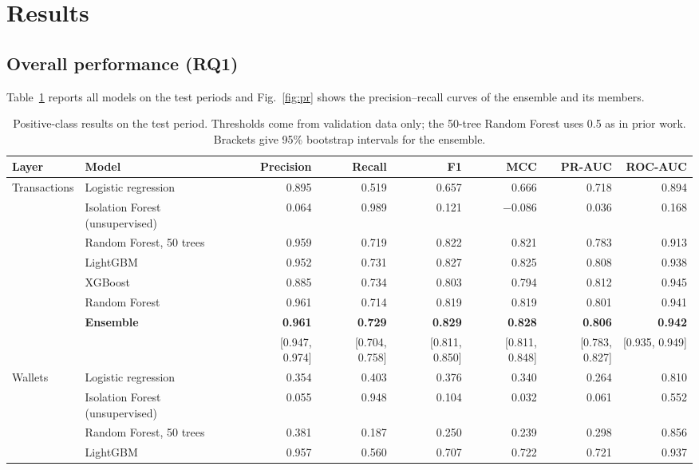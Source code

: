 \section{Results}\label{sec:results}

\subsection{Overall performance (RQ1)}\label{sec:res-main}
Table~\ref{tab:main} reports all models on the test periods and Fig.~\ref{fig:pr} shows the precision--recall curves of the ensemble and its members.

\begin{table}[t]
\caption{Positive-class results on the test period. Thresholds come from validation data only; the 50-tree Random Forest uses 0.5 as in prior work. Brackets give 95\% bootstrap intervals for the ensemble.}\label{tab:main}
\centering
\begin{tabular}{llrrrrrr}
\toprule
Layer & Model & Precision & Recall & F1 & MCC & PR-AUC & ROC-AUC \\
\midrule
Transactions & Logistic regression & 0.895 & 0.519 & 0.657 & 0.666 & 0.718 & 0.894 \\
 & Isolation Forest (unsupervised) & 0.064 & 0.989 & 0.121 & $-$0.086 & 0.036 & 0.168 \\
 & Random Forest, 50 trees~\cite{elmougy2023} & 0.959 & 0.719 & 0.822 & 0.821 & 0.783 & 0.913 \\
 & LightGBM & 0.952 & 0.731 & 0.827 & 0.825 & 0.808 & 0.938 \\
 & XGBoost & 0.885 & 0.734 & 0.803 & 0.794 & 0.812 & 0.945 \\
 & Random Forest & 0.961 & 0.714 & 0.819 & 0.819 & 0.801 & 0.941 \\
 & \textbf{Ensemble} & \textbf{0.961} & \textbf{0.729} & \textbf{0.829} & \textbf{0.828} & \textbf{0.806} & \textbf{0.942} \\
 & & [0.947, 0.974] & [0.704, 0.758] & [0.811, 0.850] & [0.811, 0.848] & [0.783, 0.827] & [0.935, 0.949] \\
\midrule
Wallets & Logistic regression & 0.354 & 0.403 & 0.376 & 0.340 & 0.264 & 0.810 \\
 & Isolation Forest (unsupervised) & 0.055 & 0.948 & 0.104 & 0.032 & 0.061 & 0.552 \\
 & Random Forest, 50 trees~\cite{elmougy2023} & 0.381 & 0.187 & 0.250 & 0.239 & 0.298 & 0.856 \\
 & LightGBM & 0.957 & 0.560 & 0.707 & 0.722 & 0.721 & 0.937 \\

\end{tabular}
\end{table}
